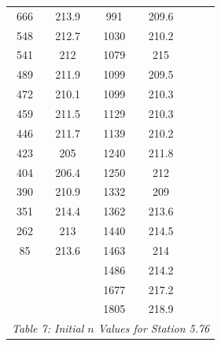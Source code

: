 \begin{center}
\begin{tabular}{|cc||cc||cc|}
    666      & 213.9                    & 991  & 209.6                         &          &                                    \\
    548      & 212.7                    & 1030 & 210.2                         &          &                                    \\
    541      & 212                      & 1079 & 215                           &          &                                    \\
    489      & 211.9                    & 1099 & 209.5                         &          &                                    \\
    472      & 210.1                    & 1099 & 210.3                         &          &                                    \\
    459      & 211.5                    & 1129 & 210.3                         &          &                                    \\
    446      & 211.7                    & 1139 & 210.2                         &          &                                    \\
    423      & 205                      & 1240 & 211.8                         &          &                                    \\
    404      & 206.4                    & 1250 & 212                           &          &                                    \\
    390      & 210.9                    & 1332 & 209                           &          &                                    \\
    351      & 214.4                    & 1362 & 213.6                         &          &                                    \\
    262      & 213                      & 1440 & 214.5                         &          &                                    \\
    85       & 213.6                    & 1463 & 214                           &          &                                    \\
             &                          & 1486 & 214.2                         &          &                                    \\
             &                          & 1677 & 217.2                         &          &                                    \\
             &                          & 1805 & 218.9                         &          &                                    \\
    \hline\multicolumn{6}{c}{\emph{Table 7: Initial $n$ Values for Station 5.76}}
\end{tabular}


\end{center}
